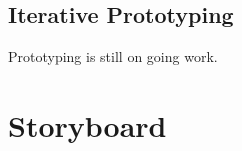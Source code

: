 \documentclass[12pt, a4paper]{report} \usepackage[titletoc]{appendix}
\begin{document}
\begin{appendices}
\section{Iterative Prototyping}
Prototyping is still on going work.


\chapter{Storyboard}
\label{Storyboards}

\end{appendices}
\end{document}

